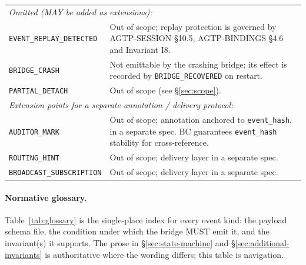 \begin{longtable}{p{} p{}}
\midrule
\multicolumn{2}{l}{\emph{Omitted (MAY be added as extensions):}} \\
\texttt{EVENT\_REPLAY\_DETECTED} & Out of scope; replay protection is
governed by AGTP-SESSION \S 10.5, AGTP-BINDINGS \S 4.6 and Invariant I8. \\
\texttt{BRIDGE\_CRASH} & Not emittable by the crashing bridge; its
effect is recorded by \texttt{BRIDGE\_RECOVERED} on restart. \\
\texttt{PARTIAL\_DETACH} & Out of scope (see \S\ref{sec:scope}). \\
\midrule
\multicolumn{2}{l}{\emph{Extension points for a separate annotation / delivery protocol:}} \\
\texttt{AUDITOR\_MARK} & Out of scope; annotation anchored to
\texttt{event\_hash}, in a separate spec. BC guarantees
\texttt{event\_hash} stability for cross-reference. \\
\texttt{ROUTING\_HINT} & Out of scope; delivery layer in a separate
spec. \\
\texttt{BROADCAST\_SUBSCRIPTION} & Out of scope; delivery layer in
a separate spec. \\
\bottomrule
\end{longtable}

\paragraph{Normative glossary.}
Table~\ref{tab:glossary} is the single-place index for every event
kind: the payload schema file, the condition under which the bridge
MUST emit it, and the invariant(s) it supports. The prose in
\S\ref{sec:state-machine} and \S\ref{sec:additional-invariants} is
authoritative where the wording differs; this table is navigation.

